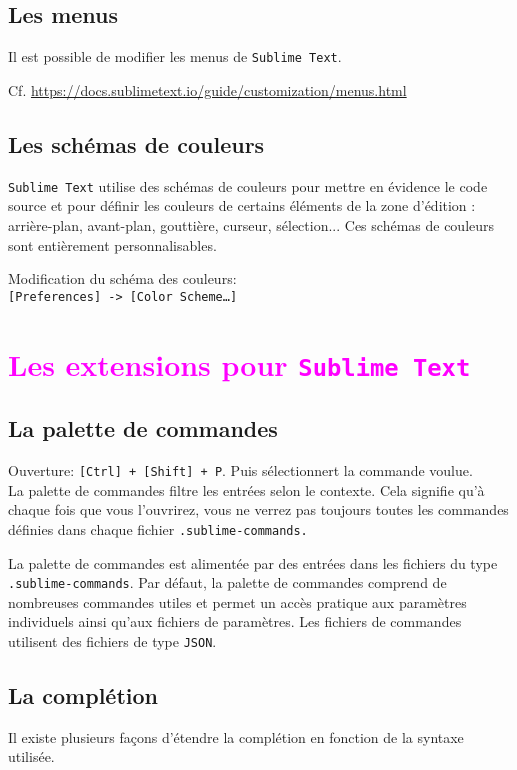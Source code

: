 \documentclass[french,a4paper]{article}
\begin{document}
\subsection*{Les menus}
Il est possible de modifier les menus de \texttt{Sublime Text}.

Cf. \url{https://docs.sublimetext.io/guide/customization/menus.html}
\bigskip

\subsection*{Les schémas de couleurs}

\texttt{Sublime Text} utilise des schémas de couleurs pour mettre en évidence
 le code source et pour définir les couleurs de certains éléments de la zone 
 d'édition : arrière-plan, avant-plan, gouttière, curseur, sélection... Ces 
 schémas de couleurs sont entièrement personnalisables.
 \medskip

 Modification du schéma des couleurs: \\
 \texttt{[Preferences] -> [Color Scheme\dots]}
\bigskip

\section{\textcolor{magenta}{Les extensions pour \texttt{Sublime Text}}}
\subsection*{La palette de commandes}
Ouverture: \texttt{[Ctrl] + [Shift] + P}. Puis sélectionnert la commande 
 voulue. \\
La palette de commandes filtre les entrées selon le contexte. Cela signifie
 qu'à chaque fois que vous l'ouvrirez, vous ne verrez pas toujours toutes les
 commandes définies dans chaque fichier \texttt{.sublime-commands.}
\medskip

La palette de commandes est alimentée par des entrées dans les fichiers du 
 type \texttt{.sublime-commands}. Par défaut, la palette de commandes comprend
 de nombreuses commandes utiles et permet un accès pratique aux paramètres 
 individuels ainsi qu'aux fichiers de paramètres. Les fichiers de commandes 
 utilisent des fichiers de type \texttt{JSON}.

 \subsection*{La complétion}
Il existe plusieurs façons d'étendre la complétion en fonction de la syntaxe
utilisée.
\end{document}
